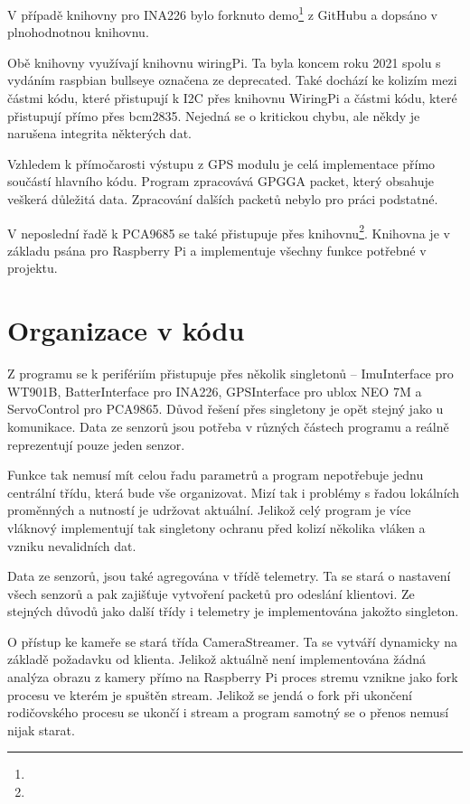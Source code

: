 \documentclass[a4paper,oneside,12pt]{report}
\begin{document}
V případě knihovny pro INA226 bylo forknuto demo\footnote{} z GitHubu a dopsáno v plnohodnotnou knihovnu.


Obě knihovny využívají knihovnu wiringPi.
Ta byla koncem roku 2021 spolu s vydáním raspbian bullseye označena ze deprecated.
Také dochází ke kolizím mezi částmi kódu, které přistupují k I2C přes knihovnu WiringPi a částmi kódu, které přistupují přímo přes bcm2835.
Nejedná se o kritickou chybu, ale někdy je narušena integrita některých dat.

Vzhledem k přímočarosti výstupu z GPS modulu je celá implementace přímo součástí hlavního kódu.
Program zpracovává GPGGA packet, který obsahuje veškerá důležitá data.
Zpracování dalších packetů nebylo pro práci podstatné.

V neposlední řadě k PCA9685 se také přistupuje přes knihovnu\footnote{}.
Knihovna je v základu psána pro Raspberry Pi a implementuje všechny funkce potřebné v projektu.

\section{Organizace v kódu}

Z programu se k perifériím přistupuje přes několik singletonů -- ImuInterface pro WT901B, BatterInterface pro INA226, GPSInterface pro ublox NEO 7M a ServoControl pro PCA9865.
Důvod řešení přes singletony je opět stejný jako u komunikace.
Data ze senzorů jsou potřeba v různých částech programu a reálně reprezentují pouze jeden senzor.

Funkce tak nemusí mít celou řadu parametrů a program nepotřebuje jednu centrální třídu, která bude vše organizovat.
Mizí tak i problémy s řadou lokálních proměnných a nutností je udržovat aktuální.
Jelikož celý program je více vláknový implementují tak singletony ochranu před kolizí několika vláken a vzniku nevalidních dat.

Data ze senzorů, jsou také agregována v třídě telemetry.
Ta se stará o nastavení všech senzorů a pak zajišťuje vytvoření packetů pro odeslání klientovi.
Ze stejných důvodů jako další třídy i telemetry je implementována jakožto singleton.

O přístup ke kameře se stará třída CameraStreamer.
Ta se vytváří dynamicky na základě požadavku od klienta.
Jelikož aktuálně není implementována žádná analýza obrazu z kamery přímo na Raspberry Pi proces stremu vznikne jako fork procesu ve kterém je spuštěn stream.
Jelikož se jendá o fork při ukončení rodičovského procesu se ukončí i stream a program samotný se o přenos nemusí nijak starat.
\end{document}
